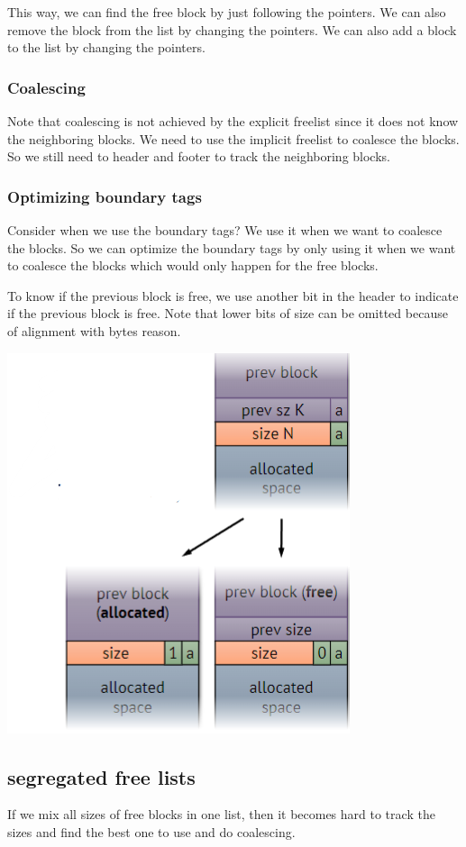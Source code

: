 \documentclass[letterpaper,12pt]{article}
\begin{document}
This way, we can find the free block by just following the pointers. We can
also remove the block from the list by changing the pointers. We can also add a
block to the list by changing the pointers.
\subsubsection{Coalescing}
Note that coalescing is not achieved by the explicit freelist since it does not
know the neighboring blocks. We need to use the implicit freelist to coalesce
the blocks. So we still need to header and footer to track the neighboring
blocks.

\subsubsection{Optimizing boundary tags}
Consider when we use the boundary tags? We use it when we want to coalesce the
blocks. So we can optimize the boundary tags by only using it when we want to
coalesce the blocks which would only happen for the free blocks.

To know if the previous block is free, we use another bit in the header to
indicate if the previous block is free. Note that lower bits of size can be
omitted because of alignment with bytes reason.

\includegraphics{Images/Optimizing boundary tags.png}
\subsection{segregated free lists}
If we mix all sizes of free blocks in one list, then it becomes hard to track
the sizes and find the best one to use and do coalescing.
\end{document}
